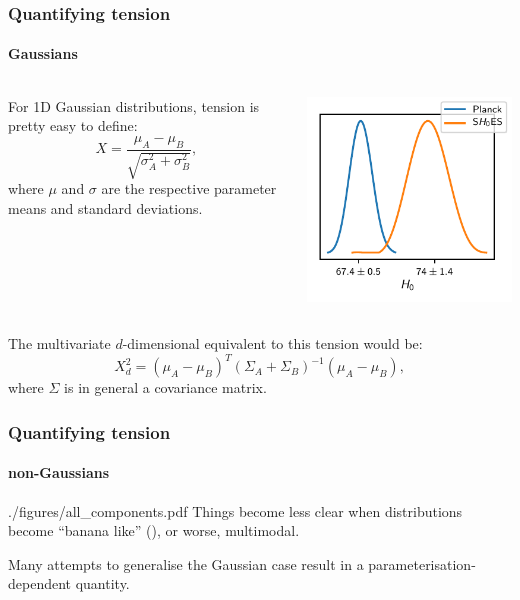 \documentclass[%
]{beamer}
\begin{document}
\begin{frame}
    \frametitle{Quantifying tension}
    \framesubtitle{Gaussians}
    \begin{columns}
        \begin{column}{0.5\textwidth}
            For 1D Gaussian distributions, tension is pretty easy to define:
            \[
                X = \frac{\mu_A - \mu_B}{\sqrt{\sigma_A^2 + \sigma_B^2}},
            \]
         where $\mu$ and $\sigma$ are the respective parameter means and standard deviations.
        \end{column}
        \begin{column}{0.5\textwidth}
            \begin{overlayarea}{\textwidth}{0.65\textheight}
                \includegraphics{./plots/H0.pdf}
            \end{overlayarea}
        \end{column}
    \end{columns}

    The multivariate $d$-dimensional equivalent to this tension would be:
    \[
        X^2_d = {(\mu_A - \mu_B)}^T{(\Sigma_A + \Sigma_B)}^{-1}(\mu_A-\mu_B),
    \]
    where $\Sigma$ is in general a covariance matrix.
\end{frame}

\begin{frame}
    \frametitle{Quantifying tension}
    \framesubtitle{non-Gaussians}
    \begin{figright}[0.4]{./figures/all_components.pdf}
        Things become less clear when distributions become ``banana like'' (),
        or worse, multimodal.
    \end{figright}
    Many attempts to generalise the Gaussian case result in a parameterisation-dependent quantity.
\end{frame}
\end{document}
